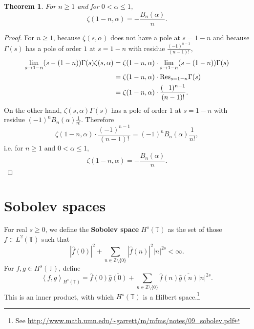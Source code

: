 \documentclass{article}
\newcommand{\inner}[2]{\left\langle #1, #2 \right\rangle}
\newcommand{\Res}{\ensuremath\mathrm{Res}}
\newtheorem{theorem}{Theorem}
\theoremstyle{definition}
\begin{document}
\begin{theorem}
For $n \geq 1$ and for $0<\alpha \leq 1$,
\[
\zeta(1-n,\alpha) = -\frac{B_n(\alpha)}{n}.
\]
\end{theorem}
\begin{proof}
For $n \geq 1$,  because $\zeta(s,\alpha)$ does not have a pole at $s=1-n$ and because $\Gamma(s)$ has a pole
of order $1$ at $s=1-n$ with residue $\frac{(-1)^{n-1}}{(n-1)!}$,
\begin{align*}
\lim_{s \to 1-n} (s-(1-n)) \Gamma(s) \zeta(s,\alpha) &= \zeta(1-n,\alpha) \cdot \lim_{s \to 1-n} (s-(1-n)) \Gamma(s)\\
&=\zeta(1-n,\alpha) \cdot \Res_{s=1-n} \Gamma(s)\\
&=\zeta(1-n,\alpha) \cdot \frac{(-1)^{n-1}}{(n-1)!}.
\end{align*}
On the other hand, $\zeta(s,\alpha) \Gamma(s)$ has a pole of order $1$ at $s=1-n$ with residue
$(-1)^n B_n(\alpha) \frac{1}{n!}$. Therefore
\[
\zeta(1-n,\alpha) \cdot \frac{(-1)^{n-1}}{(n-1)!} = (-1)^n B_n(\alpha) \frac{1}{n!},
\]
i.e. for $n \geq 1$ and $0<\alpha \leq 1$,
\[
\zeta(1-n,\alpha) = -\frac{B_n(\alpha)}{n}.
\]
\end{proof}


\section{Sobolev spaces}
For real $s \geq 0$, we define the \textbf{Sobolev space} $H^s(\mathbb{T})$ as the set of those
 $f \in L^2(\mathbb{T})$ such that
\[
|\widehat{f}(0)|^2  + \sum_{n \in \mathbb{Z} \setminus \{0\}} |\widehat{f}(n)|^2 |n|^{2s} < \infty.
\]
For $f,g \in H^s(\mathbb{T})$, define
\[
\inner{f}{g}_{H^s(\mathbb{T})} = \widehat{f}(0) \overline{\widehat{g}(0)} + \sum_{n \in \mathbb{Z} \setminus \{0\}} \widehat{f}(n)
\overline{\widehat{g}(n)} |n|^{2s}.
\]
This is an inner product, with which $H^s(\mathbb{T})$ is a Hilbert space.\footnote{See \url{http://www.math.umn.edu/~garrett/m/mfms/notes/09_sobolev.pdf}}
\end{document}

